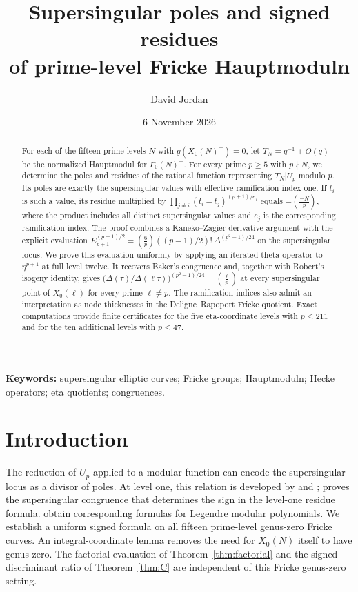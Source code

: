 \documentclass[11pt,a4paper]{article}
\title{Supersingular poles and signed residues\\of prime-level Fricke Hauptmoduln}
\author{David Jordan}
\date{6 November 2026}
\numberwithin{equation}{section}
\theoremstyle{definition}
\theoremstyle{remark}
\begin{document}
\maketitle
\begin{abstract}
For each of the fifteen prime levels $N$ with $g(X_0(N)^+)=0$,
let $T_N=q^{-1}+O(q)$ be the normalized Hauptmodul for
$\Gamma_0(N)^+$. For every prime $p\ge5$ with $p\nmid N$, we determine the poles and
residues of the rational function representing $T_N|U_p$ modulo $p$. Its poles are
exactly the supersingular values with effective ramification index one. If $t_i$ is
such a value, its residue multiplied by
$\prod_{j\ne i}(t_i-t_j)^{(p+1)/e_j}$ equals $-\left(\frac{-N}{p}\right)$, where the
product includes all distinct supersingular values and $e_j$ is the corresponding
ramification index. The proof combines a Kaneko--Zagier derivative argument with
the explicit evaluation
$E_{p+1}^{(p-1)/2}=\left(\frac6p\right)((p-1)/2)!\,\Delta^{(p^2-1)/24}$
on the supersingular locus. We prove this evaluation uniformly by applying an
iterated theta operator to $\eta^{p+1}$ at full level twelve. It recovers Baker's
congruence and, together with Robert's isogeny identity, gives
$\bigl(\Delta(\tau)/\Delta(\ell\tau)\bigr)^{(p^2-1)/24}=\left(\frac{\ell}{p}\right)$
at every supersingular point of $X_0(\ell)$ for every prime $\ell\ne p$.
The ramification indices also admit an interpretation as node thicknesses in the
Deligne--Rapoport Fricke quotient. Exact computations provide finite certificates
for the five eta-coordinate levels with $p\le211$ and for the ten
additional levels with $p\le47$.
\end{abstract}
\noindent\textbf{Keywords:} supersingular elliptic curves; Fricke groups; Hauptmoduln; Hecke operators; eta quotients; congruences.

\section{Introduction}\label{sec:intro}
The reduction of $U_p$ applied to a modular function can encode the supersingular
locus as a divisor of poles. At level one, this relation is developed by \citet{dS94} 
and \citet[\S10]{KZ98}; \citet{Baker98} proves the supersingular congruence that 
determines the sign in the level-one residue formula. \citet{BL18} obtain corresponding
formulas for Legendre modular polynomials. We establish a uniform signed formula on all 
fifteen prime-level genus-zero Fricke curves. An integral-coordinate lemma
removes the need for $X_0(N)$ itself to have genus zero. The factorial evaluation
of Theorem~\ref{thm:factorial} and the signed discriminant ratio of
Theorem~\ref{thm:C} are independent of this Fricke genus-zero setting.
\end{document}
